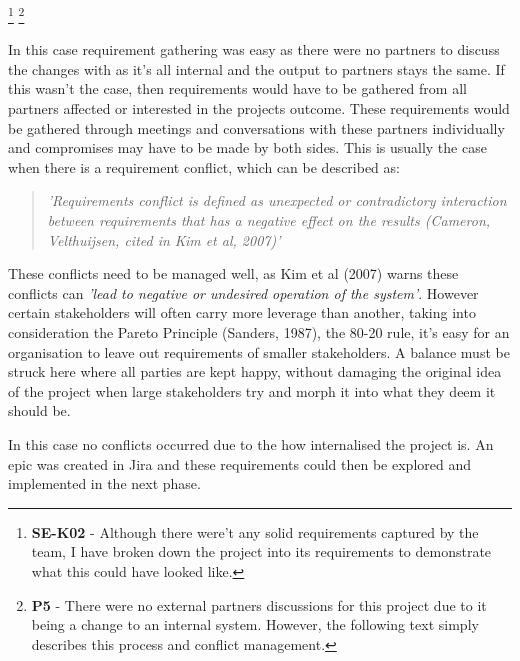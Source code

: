   \footnote{\textbf{SE-K02} - Although there were't any solid requirements captured by the team, I have broken down the project into its requirements
  to demonstrate what this could have looked like.}
  \footnote{\textbf{P5} - There were no external partners discussions for this project due to it being a change to an internal system. However, the
  following text simply describes this process and conflict management.}
  
  In this case requirement gathering was easy as there were no partners to discuss the changes with as it's all internal and the output to partners
  stays the same. If this wasn't the case, then requirements would have to be gathered from all partners affected or interested in the projects 
  outcome. These requirements would be gathered through meetings and conversations with these partners individually and compromises may have to 
  be made by both sides.
  This is usually the case when there is a requirement conflict, which can be described as:
  \begin{quote}
    \textit{'Requirements conflict is defined as unexpected or contradictory interaction between requirements that has a negative 
    effect on the results (Cameron, Velthuijsen, cited in Kim et al, 2007)'}
  \end{quote}
  These conflicts need to be managed well, as Kim et al (2007) warns these conflicts can \textit{'lead 
  to negative or undesired operation of the system'}. However certain stakeholders will often carry more leverage than another, taking into 
  consideration the Pareto Principle (Sanders, 1987), the 80-20 rule, it's easy for an organisation to leave out requirements of smaller stakeholders.
  A balance must be struck here where all parties are kept happy, without damaging the original idea of the project when large stakeholders try 
  and morph it into what they deem it should be.

  In this case no conflicts occurred due to the how internalised the project is. An epic was created in Jira and these requirements could then be explored 
  and implemented in the next phase.

\newpage